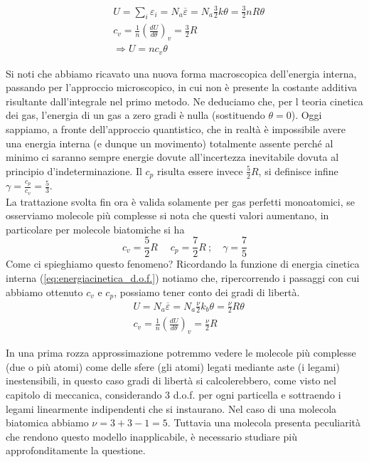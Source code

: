 \documentclass[10pt,a4paper]{article}
\begin{document}
\begin{align*} 
	&U = \sum_i \varepsilon_i= N_a \overline{\varepsilon} = N_a \frac{3}{2} k \theta = \frac{3}{2}n R \theta\\
	&c_v = \frac{1}{n}\left(\frac{dU}{d\theta}\right)_v=\frac{3}{2}R\\
	&\Rightarrow U = n c_v\theta
\end{align*} 

Si noti che abbiamo ricavato una nuova forma macroscopica dell'energia interna, passando per l'approccio microscopico, in cui non è presente la costante additiva risultante dall'integrale nel primo metodo. Ne deduciamo che, per l teoria cinetica dei gas, l'energia di un gas a zero gradi è nulla (sostituendo $\theta=0$). Oggi sappiamo, a fronte dell'approccio quantistico, che in realtà è impossibile avere una energia interna (e dunque un movimento) totalmente assente perché al minimo ci saranno sempre energie dovute all'incertezza inevitabile dovuta al principio d'indeterminazione. Il $c_p$ risulta essere invece \(\frac{5}{2}R\), si definisce infine $\gamma=\frac{c_p}{c_v}=\frac{5}{3}$.\\
La trattazione svolta fin ora è valida solamente per gas perfetti monoatomici, se osserviamo molecole più complesse si nota che questi valori aumentano, in particolare per molecole biatomiche si ha
\[c_v=\frac{5}{2}R\;\quad c_p=\frac{7}{2}R\ ; \quad \gamma = \frac{7}{5}\]
Come ci spieghiamo questo fenomeno? Ricordando la funzione di energia cinetica interna (\ref{eq:energiacinetica_d.o.f.}) notiamo che, ripercorrendo i passaggi con cui abbiamo ottenuto $c_v$ e $c_p$, possiamo tener conto dei gradi di libertà.
\begin{align*} 
	&U = N_a \overline{\varepsilon} = N_a \frac{\nu}{2} k_b \theta = \frac{\nu}{2} R \theta\\
	&c_v = \frac{1}{n}\left(\frac{dU}{d\theta}\right)_v=\frac{\nu}{2}R
\end{align*} 

In una prima rozza approssimazione potremmo vedere le molecole più complesse (due o più atomi) come delle sfere (gli atomi) legati mediante aste (i legami) inestensibili, in questo caso gradi di libertà si calcolerebbero, come visto nel capitolo di meccanica, considerando 3 d.o.f. per ogni particella e sottraendo i legami linearmente indipendenti che si instaurano. Nel caso di una molecola biatomica abbiamo $\nu = 3+3-1 = 5$. Tuttavia una molecola presenta peculiarità che rendono questo modello inapplicabile, è necessario studiare più approfonditamente la questione. 
\end{document}

